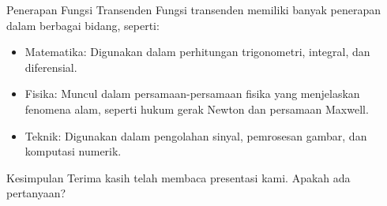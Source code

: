\documentclass{beamer}
\begin{document}
\begin{frame}{Penerapan Fungsi Transenden}
  Fungsi transenden memiliki banyak penerapan dalam berbagai bidang, seperti:

  \begin{itemize}
    \item Matematika: Digunakan dalam perhitungan trigonometri, integral, dan diferensial.
    \item Fisika: Muncul dalam persamaan-persamaan fisika yang menjelaskan fenomena alam, seperti hukum gerak Newton dan persamaan Maxwell.
    \item Teknik: Digunakan dalam pengolahan sinyal, pemrosesan gambar, dan komputasi numerik.
  \end{itemize}
\end{frame}

\begin{frame}{Kesimpulan}
  Terima kasih telah membaca presentasi kami. Apakah ada pertanyaan?
\end{frame}
\end{document}
